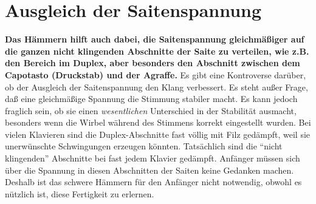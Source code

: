 \hypertarget{c2_5g}{}
\section{Ausgleich der Saitenspannung}
\label{c2_5_span} 

\textbf{Das Hämmern hilft auch dabei, die Saitenspannung gleichmäßiger auf die ganzen nicht klingenden Abschnitte der Saite zu verteilen, wie z.B. den Bereich im Duplex, aber besonders den Abschnitt zwischen dem Capotasto (Druckstab) und der Agraffe.}
Es gibt eine Kontroverse darüber, ob der Ausgleich der Saitenspannung den Klang verbessert.
Es steht außer Frage, daß eine gleichmäßige Spannung die Stimmung stabiler macht.
Es kann jedoch fraglich sein, ob sie einen \textit{wesentlichen} Unterschied in der Stabilität ausmacht, besonders wenn die Wirbel während des Stimmens korrekt eingestellt wurden.
Bei vielen Klavieren sind die Duplex-Abschnitte fast völlig mit Filz gedämpft, weil sie unerwünschte Schwingungen erzeugen könnten.
Tatsächlich sind die \enquote{nicht klingenden} Abschnitte bei fast jedem Klavier gedämpft.
Anfänger müssen sich über die Spannung in diesen Abschnitten der Saiten keine Gedanken machen.
Deshalb ist das schwere Hämmern für den Anfänger nicht notwendig, obwohl es nützlich ist, diese Fertigkeit zu erlernen.

